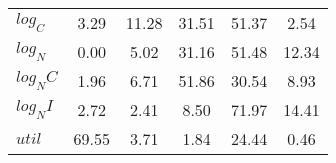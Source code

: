 \begin{center}
\begin{longtable}{lccccc}
$log_C         $	 & 	        3.29	 & 	       11.28	 & 	       31.51	 & 	       51.37	 & 	        2.54 \\ 
$log_N         $	 & 	        0.00	 & 	        5.02	 & 	       31.16	 & 	       51.48	 & 	       12.34 \\ 
$log_NC        $	 & 	        1.96	 & 	        6.71	 & 	       51.86	 & 	       30.54	 & 	        8.93 \\ 
$log_NI        $	 & 	        2.72	 & 	        2.41	 & 	        8.50	 & 	       71.97	 & 	       14.41 \\ 
$util          $	 & 	       69.55	 & 	        3.71	 & 	        1.84	 & 	       24.44	 & 	        0.46 \\ 
\end{longtable}
 \end{center}
